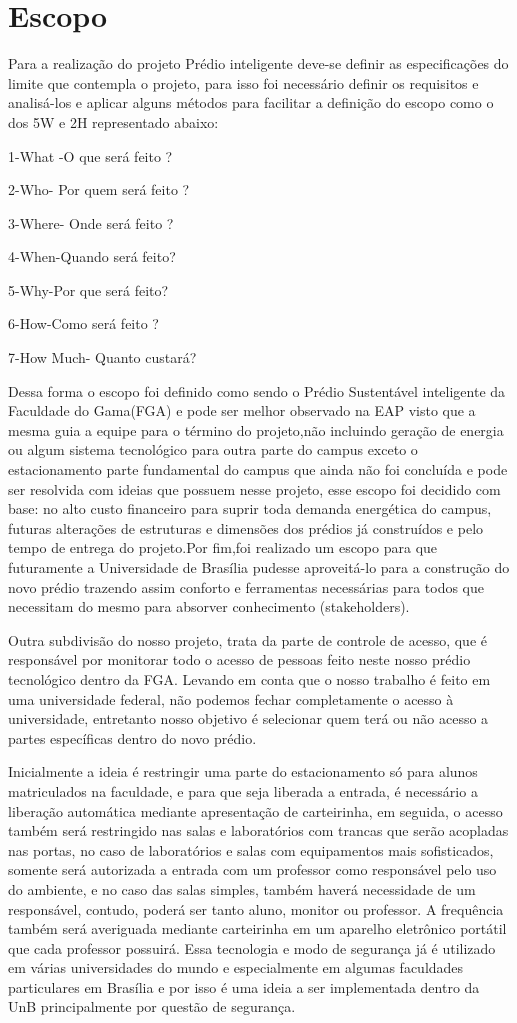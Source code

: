 \chapter{Escopo}
Para a realização do projeto Prédio inteligente deve-se definir as especificações do limite que contempla o projeto, para isso foi necessário definir os requisitos e analisá-los e aplicar alguns métodos para facilitar a definição do escopo como o dos 5W e 2H representado abaixo:

1-What -O que será feito ?

2-Who- Por quem será feito ?

3-Where- Onde será feito ?

4-When-Quando será feito?

5-Why-Por que será feito?

6-How-Como será feito ?

7-How Much- Quanto custará?

Dessa forma o escopo foi definido como sendo o Prédio Sustentável inteligente da Faculdade do Gama(FGA) e pode ser melhor observado na EAP visto que a mesma guia a equipe para o término do projeto,não incluindo geração de energia ou algum sistema tecnológico para outra parte do campus exceto o estacionamento parte fundamental do campus que ainda não foi concluída e pode ser resolvida com ideias que possuem nesse projeto, esse escopo foi decidido com base: no  alto custo financeiro para suprir toda demanda energética do campus, futuras alterações de estruturas e dimensões dos prédios já construídos e pelo tempo de entrega do projeto.Por fim,foi realizado um escopo para que futuramente a Universidade de Brasília pudesse aproveitá-lo para a construção do novo prédio trazendo assim conforto e ferramentas necessárias para todos que necessitam do mesmo para absorver conhecimento (stakeholders).

Outra subdivisão do nosso projeto, trata da parte de controle de acesso, que é responsável por monitorar todo o acesso de pessoas feito neste nosso prédio tecnológico dentro da FGA. Levando em conta que o nosso trabalho é feito em uma universidade federal, não podemos fechar completamente o acesso à universidade, entretanto nosso objetivo é selecionar quem terá ou não acesso a partes específicas dentro do novo prédio.

Inicialmente a ideia é restringir uma parte do estacionamento só para alunos matriculados na faculdade, e para que seja liberada a entrada, é necessário a liberação automática mediante apresentação de carteirinha, em seguida, o acesso também será restringido nas salas e laboratórios com trancas que serão acopladas nas portas, no caso de laboratórios e salas com equipamentos mais sofisticados, somente será autorizada a entrada com um professor como responsável pelo uso do ambiente, e no caso das salas simples, também haverá necessidade de um responsável, contudo, poderá ser tanto aluno, monitor ou professor. A frequência também será averiguada mediante carteirinha em um aparelho eletrônico portátil que cada professor possuirá. Essa tecnologia e modo de segurança já é utilizado em várias universidades do mundo e especialmente em algumas faculdades particulares em Brasília e por isso é uma ideia a ser implementada dentro da UnB principalmente por questão de segurança.

